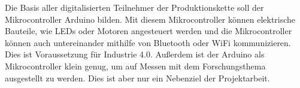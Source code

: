 Die Basis aller digitalisierten Teilnehmer der Produktionskette soll der Mikrocontroller Arduino bilden. Mit diesem Mikrocontroller können elektrische Bauteile, wie LEDs oder Motoren angesteuert werden und die Mikrocontroller können auch untereinander mithilfe von Bluetooth oder WiFi kommunizieren. Dies ist Voraussetzung für Industrie 4.0. Außerdem ist der Arduino als Mikrocontroller klein genug, um auf Messen mit dem Forschungsthema ausgestellt zu werden. Dies ist aber nur ein Nebenziel der Projektarbeit.  